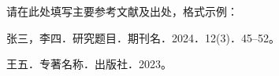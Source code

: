 \begin{GDNSFParagraphs}
请在此处填写主要参考文献及出处，格式示例：

张三，李四．研究题目．期刊名．2024．12(3)．45--52。

王五．专著名称．出版社．2023。

\GDNSFBlankPara
\end{GDNSFParagraphs}
